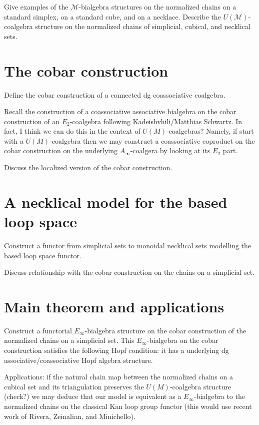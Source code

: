\documentclass{amsart}
\begin{document}
Give examples of the $\mathcal{M}$-bialgebra structures on the normalized chains on a standard simplex, on a standard cube, and on a necklace. Describe the $U(\mathcal{M})$-coalgebra structure on the normalized chains of simplicial, cubical, and necklical sets. 

\section{The cobar construction}

Define the cobar construction of a connected dg coassociative coalgebra. 

Recall the construction of a coassociative associative bialgebra on the cobar construction of an $E_2$-coalgebra following Kadeishvhili/Matthias Schwartz. In fact, I think we can do this in the context of $U(M)$-coalgebras? Namely, if start with a $U(M)$-coalgebra then we may construct a coassociative coproduct on the cobar construction on the underlying $A_{\infty}$-coalgera by looking at its $E_2$ part.

Discuss the localized version of the cobar construction.

\section{A necklical model for the based loop space}

Construct a functor from simplicial sets to monoidal necklical sets modelling the based loop space functor. 

Discuss relationship with the cobar construction on the chains on a simplicial set. 

\section{Main theorem and applications}

Construct a functorial $E_{\infty}$-bialgebra structure on the cobar construction of the normalized chains on a simplicial set. This $E_{\infty}$-bialgebra on the cobar construction satisfies the following Hopf condition: it has a underlying dg associative/coassociative Hopf algebra structure. 

Applications: if the natural chain map between the normalized chains on a cubical set and its triangulation preserves the $U(M)$-coalgebra structure (check?) we may deduce that our model is equivalent as a $E_{\infty}$-bialgebra to the normalized chains on the classical Kan loop group functor (this would use recent work of Rivera, Zeinalian, and Minichello). 


\end{document}
